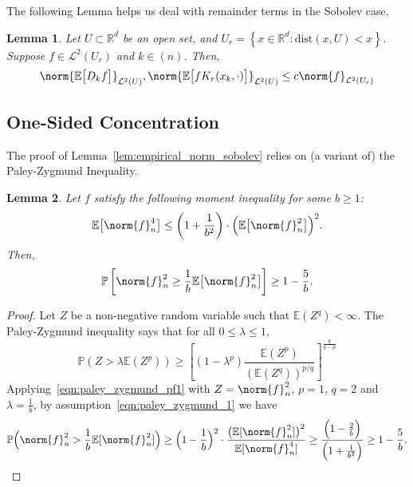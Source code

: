 \documentclass{article}
\newcommand{\Reals}{\mathbb{R}}
\newcommand{\set}[1]{\left\{#1\right\}}
\newcommand{\1}{\mathbf{1}}
\newcommand{\Rd}{\Reals^d}
\newcommand{\Leb}{\mathcal{L}}
\newcommand{\Ebb}{\mathbb{E}}
\theoremstyle{alden}
\theoremstyle{aldenthm}
\newtheorem{lemma}{Lemma}
\theoremstyle{definition}
\theoremstyle{remark}
\begin{document}
The following Lemma helps us deal with remainder terms in the Sobolev case.
\begin{lemma}
	\label{lem:remainder_term_sobolev}
	Let $U \subset \Rd$ be an open set, and $U_r = \set{x \in \Rd: \mathrm{dist}(x,U) < x}$. Suppose $f \in \Leb^2(U_r)$ and $k \in (n)$. Then,
	\begin{equation*}
	\norm{\Ebb\bigl[D_kf\bigr]}_{\Leb^2(U)}, \norm{\Ebb\bigl[fK_r(x_k,\cdot)\bigr]}_{\Leb^2(U)} \leq c \norm{f}_{\Leb^2(U_r)}
	\end{equation*}
\end{lemma}

\subsection{One-Sided Concentration}
	
The proof of Lemma~\ref{lem:empirical_norm_sobolev} relies on (a variant of) the Paley-Zygmund Inequality.
\begin{lemma}
	\label{lem:paley_zygmund}
	Let $f$ satisfy the following moment inequality for some $b \geq 1$:
	\begin{equation}
	\label{eqn:paley_zygmund_1}
	\Ebb\bigl[\norm{f}_n^4\bigr] \leq \left(1 + \frac{1}{b^2}\right)\cdot\Bigl(\Ebb\bigl[\norm{f}_n^2\bigr]\Bigr)^2.
	\end{equation}
	Then,
	\begin{equation}
	\label{eqn:paley_zygmund_2}
	\mathbb{P}\left[\norm{f}_n^2 \geq \frac{1}{b} \Ebb\bigl[\norm{f}_n^2\bigr]\right] \geq 1 - \frac{5}{b}.
	\end{equation}
\end{lemma}
\begin{proof}
	Let $Z$ be a non-negative random variable such that $\mathbb{E}(Z^q) < \infty$. The Paley-Zygmund inequality says that for all $0 \leq \lambda \leq 1$,
	\begin{equation}
	\label{eqn:paley_zygmund_pf1}
	\mathbb{P}(Z > \lambda \mathbb{E}(Z^p)) \geq \left[(1 - \lambda^p) \frac{\mathbb{E}(Z^p)}{(\mathbb{E}(Z^q))^{p/q}}\right]^{\frac{q}{q - p}}
	\end{equation}
	Applying~\eqref{eqn:paley_zygmund_pf1} with $Z = \norm{f}_n^2$, $p = 1$, $q = 2$ and $\lambda = \frac{1}{b}$, by assumption~\eqref{eqn:paley_zygmund_1} we have
	\begin{equation*}
	\mathbb{P}\Bigl(\norm{f}_n^2 > \frac{1}{b} \mathbb{E}[\norm{f}_n^2]\Bigr) \geq \Bigl(1 - \frac{1}{b}\Bigr)^2 \cdot  \frac{\bigl(\mathbb{E}[\norm{f}_n^2]\bigr)^2}{\mathbb{E}[\norm{f}_n^4]} \geq \frac{\Bigl(1 - \frac{2}{b}\Bigr)}{\Bigl(1 + \frac{1}{b^2}\Bigr)} \geq 1 - \frac{5}{b}.
	\end{equation*}
\end{proof}
\end{document}
